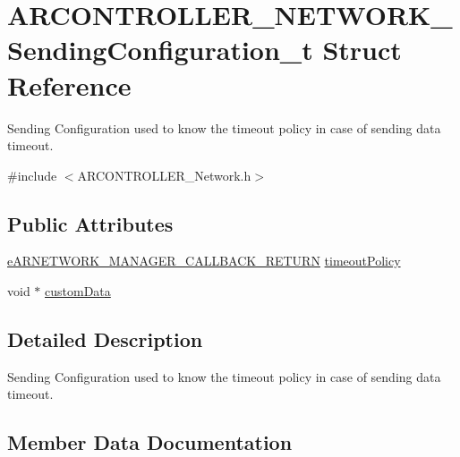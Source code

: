 \hypertarget{struct_a_r_c_o_n_t_r_o_l_l_e_r___n_e_t_w_o_r_k___sending_configuration__t}{}\section{A\+R\+C\+O\+N\+T\+R\+O\+L\+L\+E\+R\+\_\+\+N\+E\+T\+W\+O\+R\+K\+\_\+\+Sending\+Configuration\+\_\+t Struct Reference}
\label{struct_a_r_c_o_n_t_r_o_l_l_e_r___n_e_t_w_o_r_k___sending_configuration__t}


Sending Configuration used to know the timeout policy in case of sending data timeout.  




{\ttfamily \#include $<$A\+R\+C\+O\+N\+T\+R\+O\+L\+L\+E\+R\+\_\+\+Network.\+h$>$}

\subsection*{Public Attributes}
\begin{DoxyCompactItemize}
\item 
\hyperlink{_a_r_n_e_t_w_o_r_k___manager_8h_a1a1d7235d3e2a2ff206fad131eacfc11}{e\+A\+R\+N\+E\+T\+W\+O\+R\+K\+\_\+\+M\+A\+N\+A\+G\+E\+R\+\_\+\+C\+A\+L\+L\+B\+A\+C\+K\+\_\+\+R\+E\+T\+U\+RN} \hyperlink{struct_a_r_c_o_n_t_r_o_l_l_e_r___n_e_t_w_o_r_k___sending_configuration__t_a77b199bd1bc87731add70ed10ac70521}{timeout\+Policy}
\item 
void $\ast$ \hyperlink{struct_a_r_c_o_n_t_r_o_l_l_e_r___n_e_t_w_o_r_k___sending_configuration__t_a2cbbadc2a500c2ac5ed173befcdfb6ba}{custom\+Data}
\end{DoxyCompactItemize}


\subsection{Detailed Description}
Sending Configuration used to know the timeout policy in case of sending data timeout. 

\subsection{Member Data Documentation}

